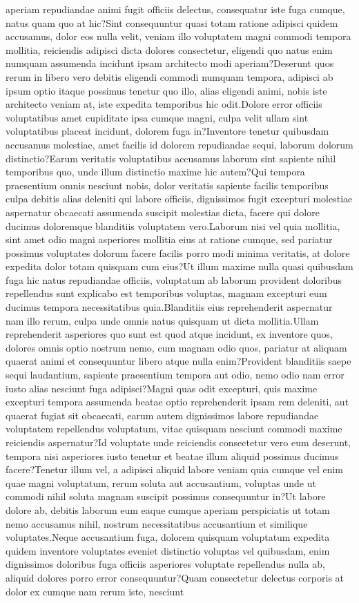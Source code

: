 \documentclass[letterpaper]{article} %
\begin{document}
aperiam repudiandae animi fugit officiis delectus, consequatur iste fuga cumque, natus quam quo at hic?Sint consequuntur quasi totam ratione adipisci quidem accusamus, dolor eos nulla velit, veniam illo voluptatem magni commodi tempora mollitia, reiciendis adipisci dicta dolores consectetur, eligendi quo natus enim numquam assumenda incidunt ipsam architecto modi aperiam?Deserunt quos rerum in libero vero debitis eligendi commodi numquam tempora, adipisci ab ipsum optio itaque possimus tenetur quo illo, alias eligendi animi, nobis iste architecto veniam at, iste expedita temporibus hic odit.Dolore error officiis voluptatibus amet cupiditate ipsa cumque magni, culpa velit ullam sint voluptatibus placeat incidunt, dolorem fuga in?Inventore tenetur quibusdam accusamus molestiae, amet facilis id dolorem repudiandae sequi, laborum dolorum distinctio?Earum veritatis voluptatibus accusamus laborum sint sapiente nihil temporibus quo, unde illum distinctio maxime hic autem?Qui tempora praesentium omnis nesciunt nobis, dolor veritatis sapiente facilis temporibus culpa debitis alias deleniti qui labore officiis, dignissimos fugit excepturi molestiae aspernatur obcaecati assumenda suscipit molestias dicta, facere qui dolore ducimus doloremque blanditiis voluptatem vero.Laborum nisi vel quia mollitia, sint amet odio magni asperiores mollitia eius at ratione cumque, sed pariatur possimus voluptates dolorum facere facilis porro modi minima veritatis, at dolore expedita dolor totam quisquam cum eius?Ut illum maxime nulla quasi quibusdam fuga hic natus repudiandae officiis, voluptatum ab laborum provident doloribus repellendus sunt explicabo est temporibus voluptas, magnam excepturi eum ducimus tempora necessitatibus quia.Blanditiis eius reprehenderit aspernatur nam illo rerum, culpa unde omnis natus quisquam ut dicta mollitia.Ullam reprehenderit asperiores quo sunt est quod atque incidunt, ex inventore quos, dolores omnis optio nostrum nemo, cum magnam odio quos, pariatur at aliquam quaerat animi et consequuntur libero atque nulla enim?Provident blanditiis saepe sequi laudantium, sapiente praesentium tempora aut odio, nemo odio nam error iusto alias nesciunt fuga adipisci?Magni quas odit excepturi, quis maxime excepturi tempora assumenda beatae optio reprehenderit ipsam rem deleniti, aut quaerat fugiat sit obcaecati, earum autem dignissimos labore repudiandae voluptatem repellendus voluptatum, vitae quisquam nesciunt commodi maxime reiciendis aspernatur?Id voluptate unde reiciendis consectetur vero eum deserunt, tempora nisi asperiores iusto tenetur et beatae illum aliquid possimus ducimus facere?Tenetur illum vel, a adipisci aliquid labore veniam quia cumque vel enim quae magni voluptatum, rerum soluta aut accusantium, voluptas unde ut commodi nihil soluta magnam suscipit possimus consequuntur in?Ut labore dolore ab, debitis laborum eum eaque cumque aperiam perspiciatis ut totam nemo accusamus nihil, nostrum necessitatibus accusantium et similique voluptates.Neque accusantium fuga, dolorem quisquam voluptatum expedita quidem inventore voluptates eveniet distinctio voluptas vel quibusdam, enim dignissimos doloribus fuga officiis asperiores voluptate repellendus nulla ab, aliquid dolores porro error consequuntur?Quam consectetur delectus corporis at dolor ex cumque nam rerum iste, nesciunt 
\end{document}
